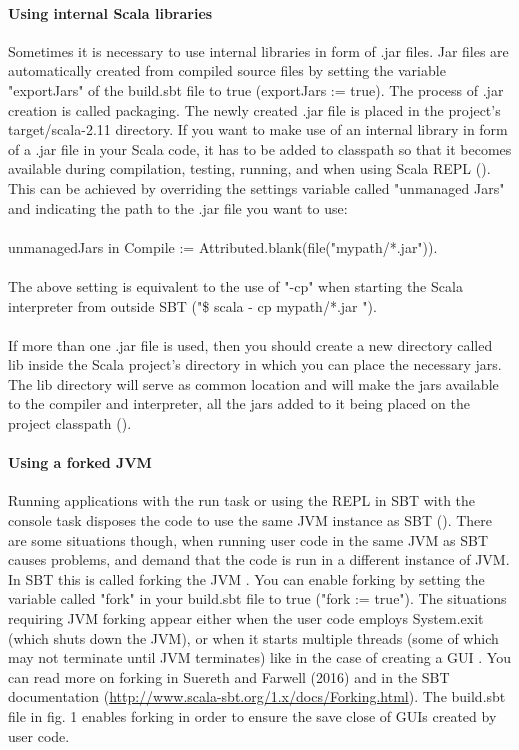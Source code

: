 \documentclass {article}
\begin{document}
\paragraph{Using internal Scala libraries}

Sometimes it is necessary to use internal libraries in form of .jar files.
 Jar files are automatically created from compiled source files by setting the variable "exportJars" of the build.sbt file to true (exportJars := true).
 The process of .jar creation is called packaging.
 The newly created .jar file is placed in the project's target/scala-2.11 directory.
 If you want to make use of an internal library in form of a .jar file in your Scala code, it has to be added to classpath so that it becomes available during compilation, testing, running, and when using Scala REPL (\cite{noauthor_sbt_2017}). 
This can be achieved by overriding the settings variable called "unmanaged Jars" and indicating the path to the .jar file you want to use:
\\
\\
unmanagedJars in Compile := Attributed.blank(file("mypath/*.jar")). 
\\
\\
The above setting is equivalent to the use of "-cp" when starting the Scala interpreter from outside SBT ("\$ scala - cp mypath/*.jar ").      
\\
\\
If more than one .jar file is used, then you should create a new directory called lib inside the Scala project's directory in which you can place the necessary jars. 
The lib directory will serve as common location and will make the jars available to the compiler and interpreter, all the jars added to it being placed on the project classpath (\cite{noauthor_sbt_2017}). 

\paragraph {Using a forked JVM}

Running applications with the run task or using the REPL in SBT with the console task disposes the code to use the same JVM instance as SBT (\cite{noauthor_sbt_2017}). 
There are some situations though, when running user code in the same JVM as SBT causes problems, and demand that the code is run in a different instance of JVM.
 In SBT this is called forking the JVM \cite{suereth_sbt_2016}.
 You can enable forking by setting the variable called "fork" in your build.sbt file to true ("fork := true").
 The situations requiring JVM forking appear either when the user code employs System.exit (which shuts down the JVM), or when it starts multiple threads (some of which may not terminate until JVM terminates) like in the case of creating a GUI \cite{noauthor_sbt_2017}.
 You can read more on forking in Suereth and Farwell (2016) and in the SBT documentation (\href{http://www.scala-sbt.org/1.x/docs/Forking.html}{http://www.scala-sbt.org/1.x/docs/Forking.html}).
 The build.sbt file in fig. 1 enables forking in order to ensure the save close of GUIs created by user code.      
\end{document}
